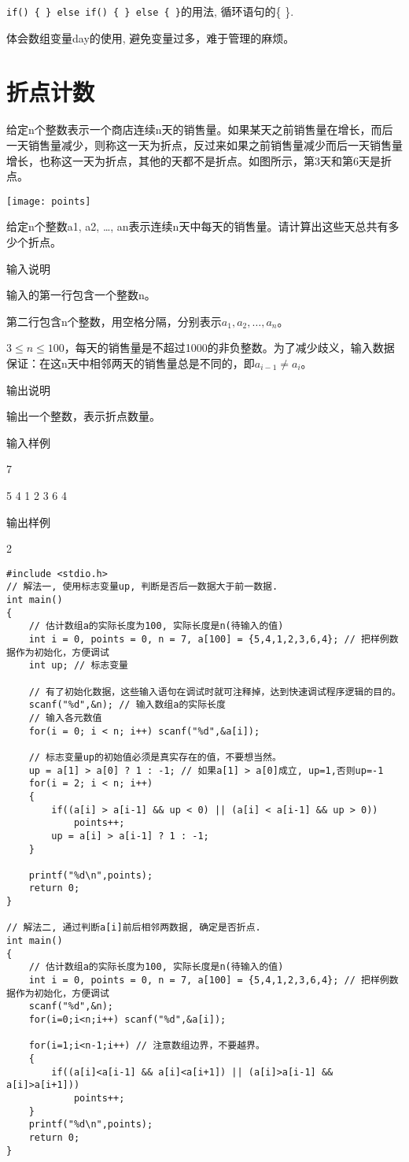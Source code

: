 \begin{note}[要点]
	\lstinline|if() { } else if() { } else { }|的用法, 循环语句的\{ \}.
	
	体会数组变量day的使用, 避免变量过多，难于管理的麻烦。
\end{note}

\section{折点计数}	
给定n个整数表示一个商店连续n天的销售量。如果某天之前销售量在增长，而后一天销售量减少，则称这一天为折点，反过来如果之前销售量减少而后一天销售量增长，也称这一天为折点，其他的天都不是折点。如图所示，第3天和第6天是折点。

\texttt{[image: points]}

给定n个整数a1, a2, \dots, an表示连续n天中每天的销售量。请计算出这些天总共有多少个折点。

输入说明
	
输入的第一行包含一个整数n。

第二行包含n个整数，用空格分隔，分别表示$a_1, a_2, \dots, a_n$。

$3\le n\le 100$，每天的销售量是不超过1000的非负整数。为了减少歧义，输入数据保证：在这n天中相邻两天的销售量总是不同的，即$a_{i-1}\ne a_i$。

输出说明	

输出一个整数，表示折点数量。

输入样例	

7

5 4 1 2 3 6 4

输出样例
	
2

\begin{lstlisting}
#include <stdio.h>
// 解法一, 使用标志变量up, 判断是否后一数据大于前一数据.
int main()
{
    // 估计数组a的实际长度为100, 实际长度是n(待输入的值)
	int i = 0, points = 0, n = 7, a[100] = {5,4,1,2,3,6,4}; // 把样例数据作为初始化，方便调试
	int up; // 标志变量 
	
	// 有了初始化数据，这些输入语句在调试时就可注释掉，达到快速调试程序逻辑的目的。
	scanf("%d",&n); // 输入数组a的实际长度
	// 输入各元数值
	for(i = 0; i < n; i++) scanf("%d",&a[i]);
	
	// 标志变量up的初始值必须是真实存在的值，不要想当然。
	up = a[1] > a[0] ? 1 : -1; // 如果a[1] > a[0]成立, up=1,否则up=-1
	for(i = 2; i < n; i++)
	{
		if((a[i] > a[i-1] && up < 0) || (a[i] < a[i-1] && up > 0))
			points++;
		up = a[i] > a[i-1] ? 1 : -1;
	}
	
	printf("%d\n",points);
	return 0;
} 

// 解法二, 通过判断a[i]前后相邻两数据, 确定是否折点. 
int main()
{
	// 估计数组a的实际长度为100, 实际长度是n(待输入的值)
	int i = 0, points = 0, n = 7, a[100] = {5,4,1,2,3,6,4}; // 把样例数据作为初始化，方便调试
	scanf("%d",&n);
	for(i=0;i<n;i++) scanf("%d",&a[i]);
	
	for(i=1;i<n-1;i++) // 注意数组边界，不要越界。 
	{
		if((a[i]<a[i-1] && a[i]<a[i+1]) || (a[i]>a[i-1] && a[i]>a[i+1]))
			points++;
	}
	printf("%d\n",points);
	return 0;
}
\end{lstlisting}

